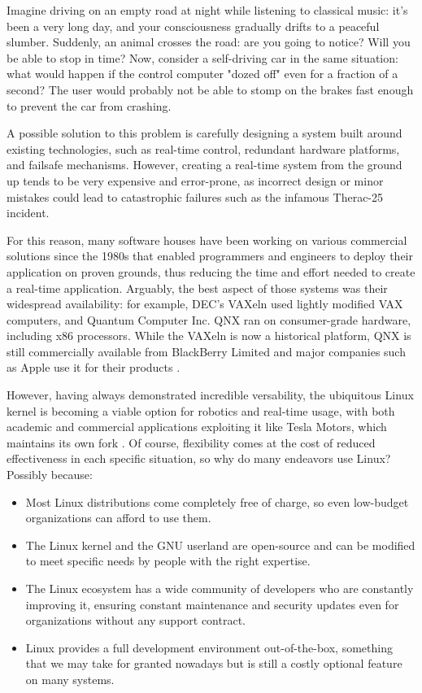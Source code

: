 \documentclass[a4paper,12pt]{report}
\begin{document}
Imagine driving on an empty road at night while listening to classical music: it's been a very long day, and your consciousness gradually drifts to a peaceful slumber. Suddenly, an animal crosses the road: are you going to notice? Will you be able to stop in time? Now, consider a self-driving car in the same situation: what would happen if the control computer "dozed off" even for a fraction of a second? The user would probably not be able to stomp on the brakes fast enough to prevent the car from crashing.

A possible solution to this problem is carefully designing a system built around existing technologies, such as real-time control, redundant hardware platforms, and failsafe mechanisms. However, creating a real-time system from the ground up tends to be very expensive and error-prone, as incorrect design or minor mistakes could lead to catastrophic failures such as the infamous Therac-25 \cite{therac-25-accidents} incident.

For this reason, many software houses have been working on various commercial solutions since the 1980s that enabled programmers and engineers to deploy their application on proven grounds, thus reducing the time and effort needed to create a real-time application. Arguably, the best aspect of those systems was their widespread availability: for example, DEC's VAXeln used lightly modified VAX computers, and Quantum Computer Inc. QNX ran on consumer-grade hardware, including x86 processors. While the VAXeln is now a historical platform, QNX is still commercially available from BlackBerry Limited and major companies such as Apple use it for their products \cite{time-carplay-qnx}.

However, having always demonstrated incredible versability, the ubiquitous Linux kernel is becoming a viable option for robotics and real-time usage, with both academic and commercial applications exploiting it like Tesla Motors, which maintains its own fork \cite{gh-tesla-linux}. Of course, flexibility comes at the cost of reduced effectiveness in each specific situation, so why do many endeavors use Linux? Possibly because:
\begin{itemize}
  \item Most Linux distributions come completely free of charge, so even low-budget organizations can afford to use them.
  \item The Linux kernel and the GNU userland are open-source and can be modified to meet specific needs by people with the right expertise.
  \item The Linux ecosystem has a wide community of developers who are constantly improving it, ensuring constant maintenance and security updates even for organizations without any support contract.
  \item Linux provides a full development environment out-of-the-box, something that we may take for granted nowadays but is still a costly optional feature on many systems.
\end{itemize}
\end{document}

